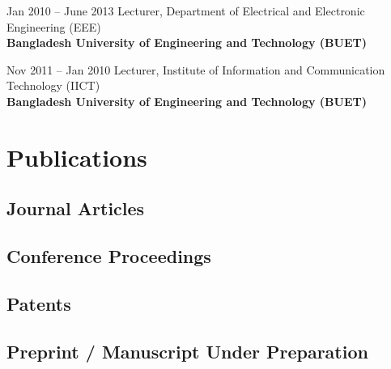 \documentclass[cvauthor={Dr. Sajid Muhaimin Choudhury}]{buetcv}
\begin{document}
        \begin{twocolentry}{
            Jan 2010 – June 2013
            }
            Lecturer, Department of Electrical and Electronic Engineering (EEE) \\ \textbf{Bangladesh University of Engineering and Technology (BUET)}\\
        \end{twocolentry}

        \begin{twocolentry}{
            Nov 2011 – Jan 2010
            }
            Lecturer, Institute of Information and Communication Technology (IICT) \\ \textbf{Bangladesh University of Engineering and Technology (BUET)}\\
        \end{twocolentry}        
    
\section{Publications}
    
\subsection{Journal Articles}
\nocite{*}
\newrefcontext[labelprefix=J]
\printbibliography[env=counter,type=article,heading=none]
\printbibliography[type=article,heading=none]

\subsection{Conference Proceedings}
\nocite{*}
\newrefcontext[labelprefix=C]
\printbibliography[env=counter,type=inproceedings,heading=none]
\printbibliography[type=inproceedings,heading=none]


\subsection{Patents}
\nocite{*}
\newrefcontext[labelprefix=P]
\printbibliography[env=counter,type=patent,heading=none]
\printbibliography[type=patent,heading=none]

\subsection{Preprint / Manuscript Under Preparation}
\nocite{*}
\newrefcontext[labelprefix=X]
\printbibliography[env=counter,type=unpublished,heading=none]
\printbibliography[type=unpublished,heading=none]
\end{document}
